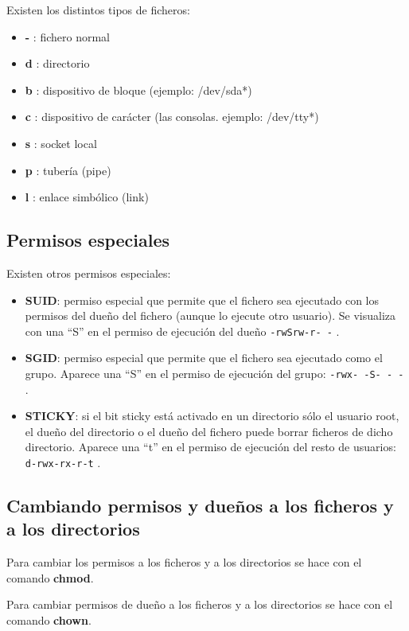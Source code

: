 \documentclass{../../../yukibook.cls/yukibook}
\begin{document}
Existen los distintos tipos de ficheros:
\begin{itemize}
    \item \textbf{-} : fichero normal
    \item \textbf{d} : directorio
    \item \textbf{b} : dispositivo de bloque (ejemplo: /dev/sda*)
    \item \textbf{c} : dispositivo de carácter (las consolas. ejemplo: /dev/tty*)
    \item \textbf{s} : socket local
    \item \textbf{p} : tubería (pipe)
    \item \textbf{l} : enlace simbólico (link)
\end{itemize}

\subsection{Permisos especiales}

Existen otros permisos especiales:
\begin{itemize}
    \item \textbf{SUID}: permiso especial que permite que el fichero sea ejecutado con los permisos del dueño del fichero (aunque lo ejecute otro usuario). Se visualiza con una “S” en el permiso de ejecución del dueño  \texttt{-rwSrw-r- -} .
    \item \textbf{SGID}: permiso especial que permite que el fichero sea ejecutado como el grupo. Aparece una “S” en el permiso de ejecución del grupo: \texttt{-rwx- -S- - -} .
    \item \textbf{STICKY}: si el bit sticky está activado en un directorio sólo el usuario root, el dueño del directorio o el dueño del fichero puede borrar ficheros de dicho directorio. Aparece una “t” en el permiso de ejecución del resto de usuarios:   \texttt{d-rwx-rx-r-t} .

\end{itemize}

\subsection{Cambiando permisos y dueños a los ficheros y a los directorios}

Para cambiar los permisos a los ficheros y a los directorios se hace con el comando \textbf{chmod}.

Para cambiar permisos de dueño a los ficheros y a los directorios se hace con el comando \textbf{chown}.
\end{document}
